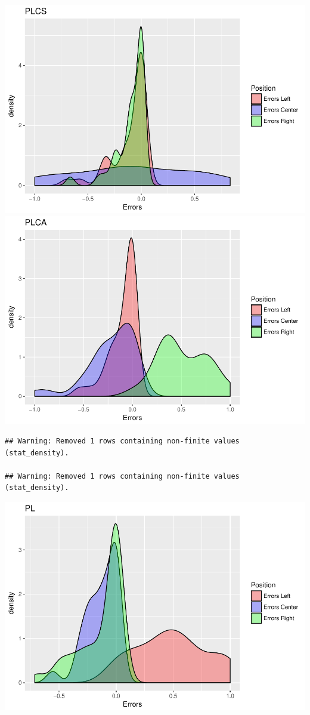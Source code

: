 \documentclass[]{article}
\begin{document}
\includegraphics{individual_analysis_report_files/figure-latex/unnamed-chunk-9-1.pdf}
\includegraphics{individual_analysis_report_files/figure-latex/unnamed-chunk-9-2.pdf}

\begin{verbatim}
## Warning: Removed 1 rows containing non-finite values (stat_density).

## Warning: Removed 1 rows containing non-finite values (stat_density).
\end{verbatim}

\includegraphics{individual_analysis_report_files/figure-latex/unnamed-chunk-9-3.pdf}
\end{document}
